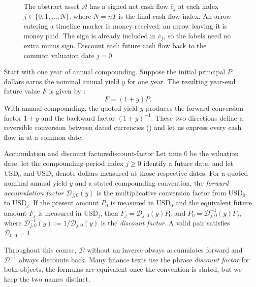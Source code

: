 \documentclass[11pt]{article}
\newcommand{\D}{\mathcal{D}}
\begin{document}
\begin{figure}[ht]
  \centering
  
  \caption{The abstract asset $\mathcal{A}$ has a signed net cash flow $\bar c_j$ at each index $j\in\{0,1,\ldots,N\}$, where $N=nT$ is the final cash-flow index. An arrow entering a timeline marker is money received; an arrow leaving it is money paid. The sign is already included in $\bar c_j$, so the labels need no extra minus sign. Discount each future cash flow back to the common valuation date $j=0$.}
  \label{fig:abstract-asset}
\end{figure}

Start with one year of annual compounding. Suppose the initial principal $P$ dollars earns the nominal annual yield $y$ for one year. The resulting year-end future value $F$ is given by :
\begin{equation}
  \label{eq:annual-compounding}
  F=(1+y)P.
\end{equation}
With annual compounding, the quoted yield $y$ produces the forward conversion factor $1+y$ and the backward factor $(1+y)^{-1}$. These two directions define a reversible conversion between dated currencies () and let us express every cash flow in  at a common date.

\begin{definition}{Accumulation and discount factors}{discount-factor}
Let time $0$ be the valuation date, let the compounding-period index $j\geq 0$ identify a future date, and let $\mathrm{USD}_0$ and $\mathrm{USD}_j$ denote dollars measured at those respective dates. For a quoted nominal annual yield $y$ and a stated compounding convention, the \emph{forward accumulation factor} $\D_{j,0}(y)$ is the multiplicative conversion factor from $\mathrm{USD}_0$ to $\mathrm{USD}_j$. If the present amount $P_0$ is measured in $\mathrm{USD}_0$ and the equivalent future amount $F_j$ is measured in $\mathrm{USD}_j$, then $F_j=\D_{j,0}(y)P_0$ and $P_0=\D_{j,0}^{-1}(y)F_j$, where $\D_{j,0}^{-1}(y):=1/\D_{j,0}(y)$ is the \emph{discount factor}. A valid pair satisfies $\D_{0,0}=1$.

Throughout this course, $\D$ without an inverse always accumulates forward and $\D^{-1}$ always discounts back. Many finance texts use the phrase \emph{discount factor} for both objects; the formulas are equivalent once the convention is stated, but we keep the two names distinct.
\end{definition}
\end{document}
